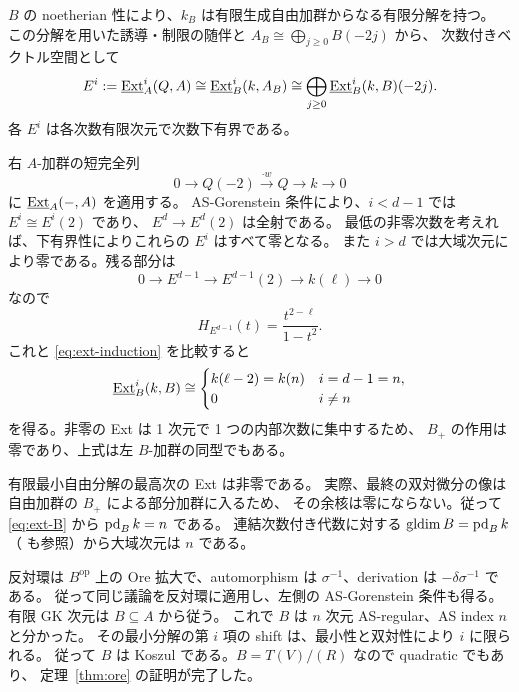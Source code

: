 \(B\) の noetherian 性により、\(k_B\) は有限生成自由加群からなる有限分解を持つ。
この分解を用いた誘導・制限の随伴と \(A_B\cong\bigoplus_{j\ge0}B(-2j)\) から、
次数付きベクトル空間として
\begin{equation}\label{eq:ext-induction}
E^i:=\underline{\operatorname{Ext}}^{i}_A(Q,A)
\cong\underline{\operatorname{Ext}}^{i}_B(k,A_B)
\cong\bigoplus_{j\ge0}
\underline{\operatorname{Ext}}^{i}_B(k,B)(-2j).
\end{equation}
各 \(E^i\) は各次数有限次元で次数下有界である。

右 \(A\)-加群の短完全列
\[
0\longrightarrow Q(-2)\xrightarrow{\cdot w}Q
\longrightarrow k\longrightarrow0
\]
に \(\underline{\operatorname{Ext}}_A(-,A)\) を適用する。
AS-Gorenstein 条件により、\(i<d-1\) では \(E^i\cong E^i(2)\) であり、
\(E^d\to E^d(2)\) は全射である。
最低の非零次数を考えれば、下有界性によりこれらの \(E^i\) はすべて零となる。
また \(i>d\) では大域次元により零である。残る部分は
\[
0\longrightarrow E^{d-1}\longrightarrow E^{d-1}(2)
\longrightarrow k(\ell)\longrightarrow0
\]
なので
\[
H_{E^{d-1}}(t)=\frac{t^{2-\ell}}{1-t^2}.
\]
これと \eqref{eq:ext-induction} を比較すると
\begin{equation}\label{eq:ext-B}
\underline{\operatorname{Ext}}^{i}_B(k,B)\cong
\begin{cases}k(\ell-2)=k(n)&i=d-1=n,\\0&i\ne n\end{cases}
\end{equation}
を得る。非零の Ext は 1 次元で 1 つの内部次数に集中するため、
\(B_+\) の作用は零であり、上式は左 \(B\)-加群の同型でもある。

有限最小自由分解の最高次の Ext は非零である。
実際、最終の双対微分の像は自由加群の \(B_+\) による部分加群に入るため、
その余核は零にならない。従って \eqref{eq:ext-B} から \(\operatorname{pd}_Bk=n\) である。
連結次数付き代数に対する \(\operatorname{gldim} B=\operatorname{pd}_Bk\)
（\cite[Proposition~2.1 の証明]{CKS} も参照）から大域次元は \(n\) である。

反対環は \(B^{\mathrm{op}}\) 上の Ore 拡大で、automorphism は
\(\sigma^{-1}\)、derivation は \(-\delta\sigma^{-1}\) である。
従って同じ議論を反対環に適用し、左側の AS-Gorenstein 条件も得る。
有限 GK 次元は \(B\subseteq A\) から従う。
これで \(B\) は \(n\) 次元 AS-regular、AS index \(n\) と分かった。
その最小分解の第 \(i\) 項の shift は、最小性と双対性により \(i\) に限られる。
従って \(B\) は Koszul である。\(B=T(V)/(R)\) なので quadratic でもあり、
定理~\ref{thm:ore} の証明が完了した。
